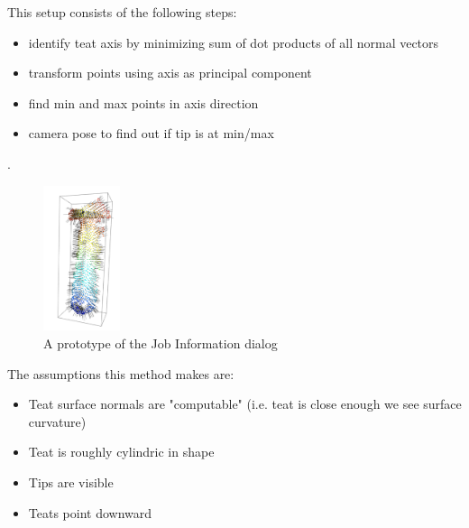     \lipsum[2-3]
    This setup consists of the following steps:
        \begin{itemize}
        \item identify teat axis by minimizing sum of dot products of all normal vectors
        \item transform points using axis as principal component
        \item find min and max points in axis direction
        \item  camera pose to find out if tip is at min/max
        \end{itemize}.
    
    \begin{figure}[!ht]
        \centering
        \includegraphics[width=0.2\textwidth]{images/cow_normals.png}
        \caption{A prototype of the Job Information dialog}
        \label{fig:cow_fmc}
    \end{figure}
    
    The assumptions this method makes are:
        \begin{itemize}
        \item Teat surface normals are "computable" (i.e. teat is close enough we see surface curvature)
        \item Teat is roughly cylindric in shape
        \item Tips are visible
        \item Teats point downward
        \end{itemize}
   \lipsum[2-3]

    
